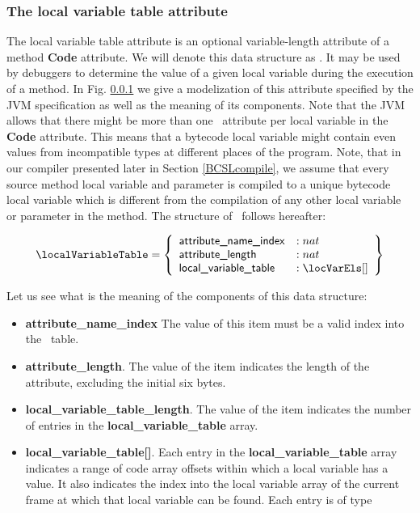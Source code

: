 \subsubsection{The local variable table attribute } \label{locVarTab}
The local variable table attribute is an optional variable-length attribute of a method \textbf{Code}  attribute. 
We will denote this data structure as  \localVariableTable.
It may be used by debuggers to determine the value of a given local variable during the execution of a method.
In Fig. \ref{locVarTab} we give a modelization of this attribute specified by the JVM specification as well as the meaning of its components.
Note that the JVM allows that  there might be more than one \localVariableTable \ attribute per local variable in the \textbf{Code} attribute.
This means that a bytecode local variable might contain even values from incompatible types at different places of the program.  
Note, that in our compiler presented later in Section \ref{BCSLcompile}, we assume that every source method local variable and parameter is compiled to a unique
bytecode local variable which is different from the compilation of any other local variable or parameter in the method.
The structure of \localVariableTable \ follows hereafter:


$$\localVariableTable = \left\{\begin{array}{ll} \mbox{\rm\textsf{attribute\_name\_index}}   & :   nat \\
                                                \mbox{\rm\textsf{attribute\_length}}   & :  nat\\
						\mbox{\rm\textsf{local\_variable\_table }} & : \locVarEls []
	                        \end{array} \right\} $$


Let us see what is the meaning of the components of this data structure:
\begin{itemize}
\item \textbf{attribute\_name\_index}
    The value of this item must be a valid index into the \constantPool \ table.

 \item \textbf{attribute\_length}.
    The value of the item indicates the length of the attribute, excluding the initial six bytes.

 \item \textbf{local\_variable\_table\_length}.
    The value of the item indicates the number of entries in the \textbf{local\_variable\_table} array.

\item \textbf{local\_variable\_table[]}.
    Each entry in the \textbf{local\_variable\_table} array indicates a range of code array
    offsets within which a local variable has a value. It also indicates the index into the
    local variable array of the current frame at which that local variable can be found.
    Each entry is of type  \locVarEls
\end{itemize}

